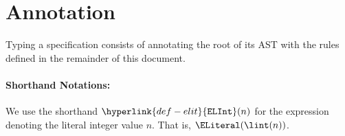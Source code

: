 \documentclass{book}
\newcommand\annotatestmt[1]{\hyperlink{def-annotatestmt}{\texttt{annotate\_stmt}}(#1)}
\newcommand\tenvone[0]{\texttt{tenv1}}
\newcommand\tenvtwo[0]{\texttt{tenv2}}
\newcommand\vs[0]{\texttt{s}}
\newcommand\vsone[0]{\texttt{s1}}
\newcommand\vstwo[0]{\texttt{s2}}
\newcommand\newsone[0]{\texttt{new\_s1}}
\newcommand\newstwo[0]{\texttt{new\_s2}}
\begin{document}

\section{Annotation}

Typing a specification consists of annotating the root of its AST with the rules defined
in the remainder of this document.


\paragraph{Shorthand Notations:}
\hypertarget{def-elit}{}
\newcommand\ELInt[1]{\hyperlink{def-elit}{\texttt{ELInt}}(#1)}
We use the shorthand $\ELInt{n}$ for the expression denoting the literal integer value $n$. That is, $\ELiteral(\lint(n))$.
\end{document}
